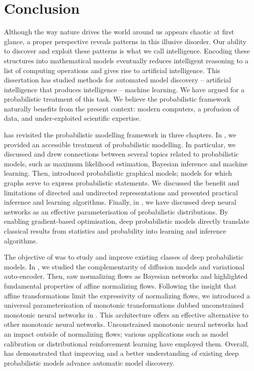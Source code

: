 \chapter{Conclusion}\label{ch:08}
Although the way nature drives the world around us appears chaotic at first glance, a proper perspective reveals patterns in this illusive disorder. Our ability to discover and exploit these patterns is what we call intelligence. Encoding these structures into mathematical models eventually reduces intelligent reasoning to a list of computing operations and gives rise to artificial intelligence. This dissertation has studied methods for automated model discovery -- artificial intelligence that produces intelligence -- machine learning. We have argued for a probabilistic treatment of this task. We believe the probabilistic framework naturally benefits from the present context: modern computers, a profusion of data, and under-exploited scientific expertise.

 has revisited the probabilistic modelling framework in three chapters. In , we provided an accessible treatment of probabilistic modelling. In particular, we discussed and drew connections between several topics related to probabilistic models, such as maximum likelihood estimation, Bayesian inference and machine learning. Then,  introduced probabilistic graphical models; models for which graphs serve to express probabilistic statements. We discussed the benefit and limitations of directed and undirected representations and presented practical inference and learning algorithms. Finally, in , we have discussed deep neural networks as an effective parameterisation of probabilistic distributions. By enabling gradient-based optimisation, deep probabilistic models directly translate classical results from statistics and probability into learning and inference algorithms.

The objective of  was to study and improve existing classes of deep probabilistic models. In , we studied the complementarity of diffusion models and variational auto-encoder. Then,  saw normalizing flows as Bayesian networks and highlighted fundamental properties of affine normalizing flows. Following the insight that affine transformations limit the expressivity of normalizing flows, we introduced a universal parameterisation of monotonic transformations dubbed unconstrained monotonic neural networks in . This architecture offers an effective alternative to other monotonic neural networks. Unconstrained monotonic neural networks had an impact outside of normalizing flows; various applications such as model calibration or distributional reinforcement learning have employed them. Overall,  has demonstrated that improving and a better understanding of existing deep probabilistic models advance automatic model discovery.

